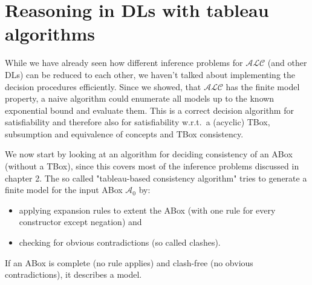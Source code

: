 \chapter{Reasoning in DLs with tableau algorithms}
While we have already seen how different inference problems for $\mathcal{ALC}$ (and other DLs) can be reduced to each other,
we haven't talked about implementing the decision procedures efficiently.
Since we showed, that $\mathcal{ALC}$ has the finite model property, a naive algorithm could enumerate all models up to the known exponential bound
and evaluate them. This is a correct decision algorithm for satisfiability
and therefore also for satisfiability w.r.t.\ a (acyclic) TBox, subsumption and equivalence of concepts and TBox consistency.

We now start by looking at an algorithm for deciding consistency of an ABox (without a TBox), since this covers most of the inference problems discussed in chapter 2.
The so called "tableau-based consistency algorithm" tries to generate a finite model for the input ABox $\mathcal{A}_0$ by:
\begin{itemize}
	\item applying expansion rules to extent the ABox (with one rule for every constructor except negation) and
	\item checking for obvious contradictions (so called clashes).
\end{itemize}
If an ABox is complete (no rule applies) and clash-free (no obvious contradictions), it describes a model.

